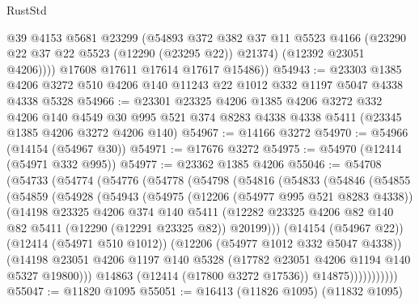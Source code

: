 \begin{lexlean}{RustStd}
\begin{coremodule}
{\begin{coremodule}
{{{{{{{{{{{{{{{{{{{{{{{{{{{{{{{{{{{{{{{{{{{{{{{{{{            @39
            @4153
            @5681
            @23299
            (@54893
              @372
              @382
              @37
              @11
              @5523
              @4166
              (@23290 @22 @37 @22 @5523 (@12290 (@23295 @22)) @21374)
              (@12392 @23051 @4206))))
        @17608
        @17611
        @17614
        @17617
        @15486))
@54943 := @23303
    @1385
    @4206
    @3272
    @510
    @4206
    @140
    @11243
    @22
    @1012
    @332
    @1197
    @5047
    @4338
    @4338
    @5328
@54966 := @23301
    @23325
    @4206
    @1385
    @4206
    @3272
    @332
    @4206
    @140
    @4549
    @30
    @995
    @521
    @374
    @8283
    @4338
    @4338
    @5411
    (@23345 @1385 @4206 @3272 @4206 @140)
@54967 := @14166 @3272
@54970 := @54966 (@14154 (@54967 @30))
@54971 := @17676 @3272
@54975 := @54970 (@12414 (@54971 @332 @995))
@54977 := @23362 @1385 @4206
@55046 := @54708
    (@54733
      (@54774
        (@54776
          (@54778
            (@54798
              (@54816
                (@54833
                  (@54846
                    (@54855
                      (@54859
                        (@54928
                          (@54943
                            (@54975
                              (@12206 (@54977 @995 @521 @8283 @4338))
                              (@14198
                                @23325
                                @4206
                                @374
                                @140
                                @5411
                                (@12282
                                  @23325
                                  @4206
                                  @82
                                  @140
                                  @82
                                  @5411
                                  (@12290 (@12291 @23325 @82))
                                  @20199)))
                            (@14154 (@54967 @22))
                            (@12414 (@54971 @510 @1012))
                            (@12206 (@54977 @1012 @332 @5047 @4338))
                            (@14198
                              @23051
                              @4206
                              @1197
                              @140
                              @5328
                              (@17782 @23051 @4206 @1194 @140 @5327 @19800)))
                          @14863
                          (@12414 (@17800 @3272 @17536))
                          @14875)))))))))))
@55047 := @11820 @1095
@55051 := @16413 (@11826 @1095) (@11832 @1095)
}}}}}}}}}}}}}}}}}}}}}}}}}}}}}}}}}}}}}}}}}}}}}}}}}}
\end{coremodule}}
\end{coremodule}
\end{lexlean}
